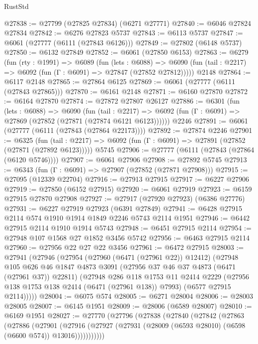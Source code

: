 \begin{lexlean}{RustStd}
\begin{coremodule}
@27838 := @27799 (@27825 @27834) (@6271 @27771)
@27840 := @6046 @27824 @27834
@27842 := @6276 @27823 @5737
@27843 := @6113 @5737
@27847 := @6061 (@27777 (@6111 (@27843 @6126)))
@27849 := @27802 (@6148 @5737)
@27850 := @6132 @27849
@27852 := @6061 (@27850 @6153)
@27863 := @6279
    (fun (rty : @1991) =>
    @6089
      (fun (lets : @6088) =>
      @6090 (fun (tail : @2217) => @6092 (fun (Γ : @6091) => @27847 (@27852 @27812)))))
    @2148
@27864 := @6117 @2148
@27865 := @27864 @6125
@27869 := @6061 (@27777 (@6111 (@27843 @27865)))
@27870 := @6161 @2148
@27871 := @6160 @27870
@27872 := @6164 @27870
@27874 := @27872 @27807 @26127
@27886 := @6301
    (fun (lets : @6088) =>
    @6090
      (fun (tail : @2217) =>
      @6092 (fun (Γ : @6091) => @27869 (@27852 (@27871 (@27874 @6121 @6123))))))
    @2246
@27891 := @6061 (@27777 (@6111 (@27843 (@27864 @22173))))
@27892 := @27874 @2246
@27901 := @6325
    (fun (tail : @2217) => @6092 (fun (Γ : @6091) => @27891 (@27852 (@27871 (@27892 @6123)))))
    @5745
@27906 := @27777 (@6111 (@27843 (@27864 (@6120 @5746))))
@27907 := @6061 @27906
@27908 := @27892 @5745
@27913 := @6343 (fun (Γ : @6091) => @27907 (@27852 (@27871 @27908)))
@27915 := @27095 (@12339 @22704)
@27916 := @27913 @27915
@27917 := @6227 @27906
@27919 := @27850 (@6152 @27915)
@27920 := @6061 @27919
@27923 := @6159 @27915 @27870 @27908
@27927 := @27917 (@27920 @27923) (@6386 @27776)
@27931 := @6227 @27919 @27923 (@6391 @27849)
@27941 := @6428 @27915 @2114 @574 @1910 @1914 @1849 @2246 @5743 @2114 @1951
@27946 := @6442 @27915 @2114 @1910 @1914 @5743
@27948 := @6451 @27915 @2114
@27954 := @27948 @107 @1568 @27 @1852 @3456 @5742
@27956 := @6463 @27915 @2114
@27960 := @27956 @22 @27 @22 @3456
@27961 := @6472 @27915
@28003 := @27941
    (@27946
      (@27954
        (@27960 (@6471 (@27961 @22)) @12412)
        (@27948
          @105
          @626
          @46
          @1847
          @4873
          @3091
          (@27956 @37 @46 @37 @4873 (@6471 (@27961 @37)) @22811)
          (@27948
            @286
            @118
            @1753
            @11
            @2414
            @2229
            (@27956 @138 @1753 @138 @2414 (@6471 (@27961 @138)) @7993)
            (@6577 @27915 @2114)))))
@28004 := @6075 @574
@28005 := @6271 @28004
@28006 := @28003 @28005
@28007 := @6145 @1951
@28009 := @28006 (@6589 @28007)
@28010 := @6169 @1951
@28027 := @27770
    (@27796
      (@27838
        (@27840
          (@27842
            (@27863
              (@27886
                (@27901
                  (@27916
                    (@27927 (@27931 (@28009 (@6593 @28010) (@6598 (@6600 @574)) @13016)))))))))))

\end{coremodule}
\end{lexlean}
